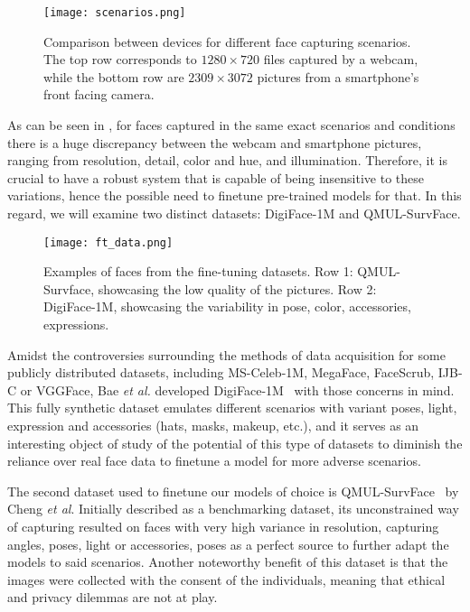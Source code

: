 \documentclass[class=report, crop=false, a4paper, 12pt]{standalone}
\begin{document}
\begin{figure}[H]
  \centering
  \texttt{[image: scenarios.png]}
  \caption[Comparison between devices for different face capturing scenarios.]{Comparison between devices for different face capturing scenarios. The top row corresponds to $1280\times720$ files captured by a webcam, while the bottom row are $2309\times3072$ pictures from a smartphone's front facing camera.}
  \label{fig:scenarios}
\end{figure}

As can be seen in , for faces captured in the same exact scenarios and conditions there is a huge discrepancy between the webcam and smartphone pictures, ranging from resolution, detail, color and hue, and illumination. Therefore, it is crucial to have a robust system that is capable of being insensitive to these variations, hence the possible need to finetune pre-trained models for that. In this regard, we will examine two distinct datasets: DigiFace-1M and QMUL-SurvFace.

\begin{figure}[H]
  \centering
  \texttt{[image: ft\_data.png]}
  \caption[Examples of faces from the fine-tuning datasets.]{Examples of faces from the fine-tuning datasets. Row 1: QMUL-Survface, showcasing the low quality of the pictures. Row 2: DigiFace-1M, showcasing the variability in pose, color, accessories, expressions.}
  \label{fig:ft_data}
\end{figure}

\par Amidst the controversies surrounding the methods of data acquisition for some publicly distributed datasets, including MS-Celeb-1M, MegaFace, FaceScrub, IJB-C or VGGFace, Bae \textit{et al.} developed DigiFace-1M~\autocite{baeDigiFace1MMillionDigital2023} with those concerns in mind. This fully synthetic dataset emulates different scenarios with variant poses, light, expression and accessories (hats, masks, makeup, etc.), and it serves as an interesting object of study of the potential of this type of datasets to diminish the reliance over real face data to finetune a model for more adverse scenarios.
\par The second dataset used to finetune our models of choice is QMUL-SurvFace~\autocite{chengSurveillanceFaceRecognition2018} by Cheng \textit{et al}. Initially described as a benchmarking dataset, its unconstrained way of capturing resulted on faces with very high variance in resolution, capturing angles, poses, light or accessories, poses as a perfect source to further adapt the models to said scenarios. Another noteworthy benefit of this dataset is that the images were collected with the consent of the individuals, meaning that ethical and privacy dilemmas are not at play.
\end{document}
